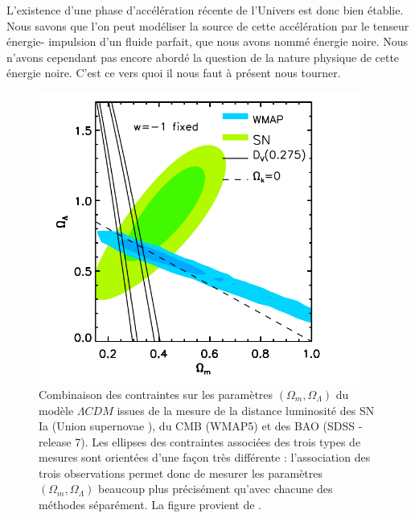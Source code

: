 \documentclass[a4paper,12pt]{report}
\theoremstyle{plain}
\theoremstyle{plain}
\begin{document}
L'existence d'une phase d'acc\'el\'eration r\'ecente de l'Univers est donc bien \'etablie. Nous
savons que l'on peut mod\'eliser la source de cette acc\'el\'eration par le tenseur \'energie-
impulsion d'un fluide parfait, que nous avons nomm\'e \'energie noire. Nous n'avons cependant
pas encore abord\'e la question de la nature physique de cette \'energie noire. C'est ce vers
quoi il nous faut \`a pr\'esent nous tourner.



	 \begin{figure}[h]
\includegraphics[width=25pc]{figgene4.png}
\caption{\label{figgene4} Combinaison des contraintes sur les param\`etres $( \Omega_m, \Omega_\Lambda )$ du mod\`ele $ \Lambda CDM$
issues de la mesure de la distance luminosit\'e des SN Ia (Union supernovae \cite{195}), du
CMB (WMAP5) et des BAO (SDSS - release 7). Les ellipses des contraintes associ\'ees des
trois types de mesures sont orient\'ees d'une fa\c{c}on tr\`es diff\'erente : l'association des trois
observations permet donc de mesurer les param\`etres $( \Omega_m, \Omega_\Lambda )$  beaucoup plus pr\'ecis\'ement
qu'avec chacune des m\'ethodes s\'epar\'ement. La figure provient de \cite{212}.
  }
\end{figure}
\end{document}
